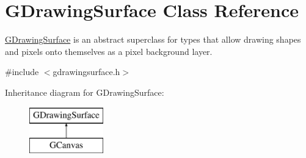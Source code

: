 \hypertarget{classGDrawingSurface}{}\section{G\+Drawing\+Surface Class Reference}
\label{classGDrawingSurface}


\mbox{\hyperlink{classGDrawingSurface}{G\+Drawing\+Surface}} is an abstract superclass for types that allow drawing shapes and pixels onto themselves as a pixel background layer.  




{\ttfamily \#include $<$gdrawingsurface.\+h$>$}

Inheritance diagram for G\+Drawing\+Surface\+:\begin{figure}[H]
\begin{center}
\leavevmode
\includegraphics[height=2.000000cm]{classGDrawingSurface}
\end{center}
\end{figure}
